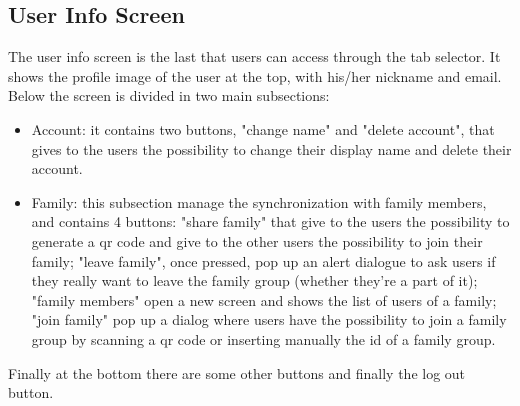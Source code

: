 \subsection{User Info Screen}
The user info screen is the last that users can access through the tab selector. It shows the profile image of the user at the top, with his/her nickname and email. Below the screen is divided in two main subsections:
\begin{itemize}
    \item Account: it contains two buttons, "change name" and "delete account", that gives to the users the possibility to change their display name and delete their account.
    \item Family: this subsection manage the synchronization with family members, and contains 4 buttons: "share family" that give to the users the possibility to generate a qr code and give to the other users the possibility to join their family; "leave family", once pressed, pop up an alert dialogue to ask users if they really want to leave the family group (whether they're a part of it); "family members" open a new screen and shows the list of users of a family; "join family" pop up a dialog where users have the possibility to join a family group by scanning a qr code or inserting manually the id of a family group.
\end{itemize}

Finally at the bottom there are some other buttons and finally the log out button.


